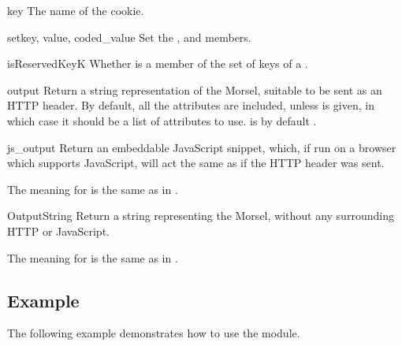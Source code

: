 \begin{memberdesc}[Morsel]{key}
The name of the cookie.
\end{memberdesc}

\begin{methoddesc}[Morsel]{set}{key, value, coded_value}
Set the ,  and  members.
\end{methoddesc}

\begin{methoddesc}[Morsel]{isReservedKey}{K}
Whether  is a member of the set of keys of a .
\end{methoddesc}

\begin{methoddesc}[Morsel]{output}{}
Return a string representation of the Morsel, suitable
to be sent as an HTTP header. By default, all the attributes are included,
unless  is given, in which case it should be a list of attributes
to use.  is by default .
\end{methoddesc}

\begin{methoddesc}[Morsel]{js_output}{}
Return an embeddable JavaScript snippet, which, if run on a browser which
supports JavaScript, will act the same as if the HTTP header was sent.

The meaning for  is the same as in .
\end{methoddesc}

\begin{methoddesc}[Morsel]{OutputString}{}
Return a string representing the Morsel, without any surrounding HTTP
or JavaScript.

The meaning for  is the same as in .
\end{methoddesc}
                

\subsection{Example \label{cookie-example}}

The following example demonstrates how to use the  module.

